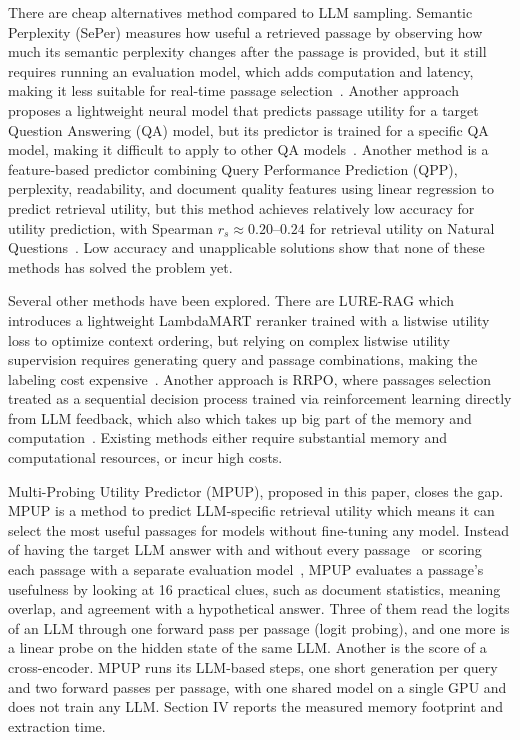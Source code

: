 \documentclass[conference]{IEEEtran}
\begin{document}
There are cheap alternatives method compared to LLM sampling. Semantic Perplexity (SePer) measures how useful a retrieved passage by observing how much its semantic perplexity changes after the passage is provided, but it still requires running an evaluation model, which adds computation and latency, making it less suitable for real-time passage selection~\cite{dai2025}. Another approach proposes a lightweight neural model that predicts passage utility for a target Question Answering (QA) model, but its predictor is trained for a specific QA model, making it difficult to apply to other QA models~\cite{perez2025}. Another method is a feature-based predictor combining Query Performance Prediction (QPP), perplexity, readability, and document quality features using linear regression to predict retrieval utility, but this method achieves relatively low accuracy for utility prediction, with Spearman $r_s \approx 0.20$--$0.24$ for retrieval utility on Natural Questions~\cite{tian2026}. Low accuracy and unapplicable solutions show that none of these methods has solved the problem yet.

Several other methods have been explored. There are LURE-RAG which introduces a lightweight LambdaMART reranker trained with a listwise utility loss to optimize context ordering, but relying on complex listwise utility supervision requires generating query and passage combinations, making the labeling cost expensive~\cite{chandra2026}. Another approach is RRPO, where passages selection treated as a sequential decision process trained via reinforcement learning directly from LLM feedback, which also which takes up big part of the memory and computation~\cite{wu2026}. Existing methods either require substantial memory and computational resources, or incur high costs.

Multi-Probing Utility Predictor (MPUP), proposed in this paper, closes the gap. MPUP is a method to predict LLM-specific retrieval utility which means it can select the most useful passages for models without fine-tuning any model. Instead of having the target LLM answer with and without every passage~\cite{zhang2025c} or scoring each passage with a separate evaluation model~\cite{dai2025}, MPUP evaluates a passage’s usefulness by looking at 16 practical clues, such as document statistics, meaning overlap, and agreement with a hypothetical answer. Three of them read the logits of an LLM through one forward pass per passage (logit probing), and one more is a linear probe on the hidden state of the same LLM. Another is the score of a cross-encoder. MPUP runs its LLM-based steps, one short generation per query and two forward passes per passage, with one shared model on a single GPU and does not train any LLM. Section IV reports the measured memory footprint and extraction time.
\end{document}
